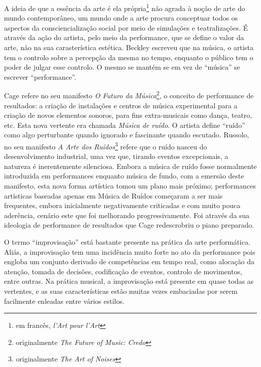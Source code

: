 \documentclass[../main.tex]{subfiles}
\begin{document}
A ideia de que a essência da arte é ela própria\footnote{em francês, \textsl{l'Art pour l'Art}} não agrada à noção de arte do mundo contemporâneo\cite{battcock}, um mundo onde a arte procura conceptuar todos os aspectos da consciencialização social por meio de simulações e teatralizações\cite{carlson1996}. É através da ação do artista, pelo meio da performance, que se define o valor da arte, não na sua carasterística estética\cite{nickas}. Beckley escreveu que na música, o artista tem o controlo sobre a percepção da mesma no tempo, enquanto o público tem o poder de julgar esse controlo\cite{beckley}. O mesmo se mantém se em vez de \enquote{música} se escrever \enquote{performance}\cite{nickas}.

Cage refere no seu manifesto \textsl{O Futuro da Música}\footnote{originalmente \textsl{The Future of Music: Credo}}, o conceito de performance de resultados: a criação de instalações e centros de música experimental para a criação de novos elementos sonoros, para fins extra-musicais como dança, teatro, etc\cite{cage1961}. Esta nova vertente era chamada \textsl{Música de ruído}. O artista define \enquote{ruído} como algo perturbante quando ignorado e fascinante quando escutado. Russolo, no seu manifesto \textsl{A Arte dos Ruídos}\footnote{originalmente \textsl{The Art of Noises}} refere que o ruído nasceu do desenvolvimento industrial, uma vez que, tirando eventos excepcionais, a natureza é inerentemente silenciosa\cite{russolo}. Embora a música de ruído fosse normalmente introduzida em performances enquanto música de fundo, com a emersão deste manifesto, esta nova forma artística tomou um plano mais próximo\cite{goldberg}; performances artísticas baseadas apenas em Música de Ruídos começaram a ser mais frequentes, embora inicialmente negativamente criticadas e com muito pouca aderência, cenário este que foi melhorando progressivamente\cite{russolo,goldberg}. Foi através da sua ideologia de performance de resultados que Cage redescrobriu o piano preparado.

O termo \enquote{improvisação} está bastante presente na prática da arte performática\cite{howell1999,goldberg}. Aliás, a improvisação tem uma incidência muito forte no ato da performance pois engloba um conjunto derivado de competências em tempo real, como alocação da atenção, tomada de decisões, codificação de eventos, controlo de movimentos, entre outras\cite{gabrielsson}. Na prática musical, a improvisação está presente em quase todas as vertentes, e as suas características estão muitas vezes embaciadas por serem facilmente enleadas entre vários estilos\cite{derek}. 
\end{document}
